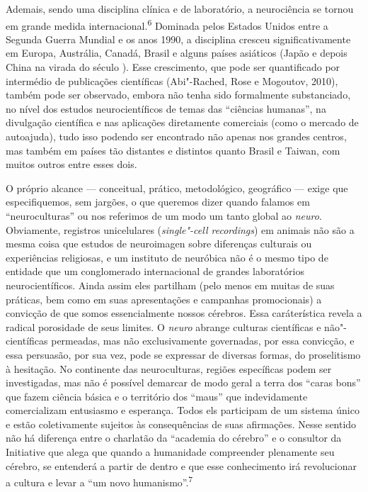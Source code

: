 Ademais, sendo uma disciplina clínica e de laboratório, a neurociência
se tornou em grande medida internacional.\textsuperscript{6} Dominada
pelos Estados Unidos entre a Segunda Guerra Mundial e os anos 1990, a
disciplina cresceu significativamente em Europa, Austrália, Canadá,
Brasil e alguns países asiáticos (Japão e depois China na virada do
século ). Esse crescimento, que pode ser quantificado por intermédio
de publicações científicas (Abi"-Rached, Rose e Mogoutov, 2010), também
pode ser observado, embora não tenha sido formalmente substanciado, no
nível dos estudos neurocientíficos de temas das ``ciências humanas'', na
divulgação científica e nas aplicações diretamente comerciais (como o
mercado de autoajuda), tudo isso podendo ser encontrado não apenas nos
grandes centros, mas também em países tão distantes e distintos quanto
Brasil e Taiwan, com muitos outros entre esses dois.

O próprio alcance --- conceitual, prático, metodológico, geográfico ---
exige que especifiquemos, sem jargões, o que queremos dizer quando
falamos em ``neuroculturas'' ou nos referimos de um modo um tanto global
ao \emph{neuro}. Obviamente, registros unicelulares (\emph{single"-cell
recordings}) em animais não são a mesma coisa que estudos de neuroimagen
sobre diferenças culturais ou experiências religiosas, e um instituto de
neuróbica não é o mesmo tipo de entidade que um conglomerado
internacional de grandes laboratórios neurocientíficos. Ainda assim eles
partilham (pelo menos em muitas de suas práticas, bem como em suas
apresentações e campanhas promocionais) a convicção de que somos
essencialmente nossos cérebros. Essa caráterística revela a radical
porosidade de seus limites. O \emph{neuro} abrange culturas científicas
e não"-científicas permeadas, mas não exclusivamente governadas, por essa
convicção, e essa persuasão, por sua vez, pode se expressar de diversas
formas, do proselitismo à hesitação. No continente das neuroculturas,
regiões específicas podem ser investigadas, mas não é possível demarcar
de modo geral a terra dos ``caras bons'' que fazem ciência básica e o
território dos ``maus'' que indevidamente comercializam entusiasmo e
esperança. Todos els participam de um sistema único e estão
coletivamente sujeitos às consequências de suas afirmações. Nesse
sentido não há diferença entre o charlatão da ``academia do cérebro'' e
o consultor da  Initiative que alega que quando a humanidade
compreender plenamente seu cérebro, se entenderá a partir de dentro e
que esse conhecimento irá revolucionar a cultura e levar a ``um novo
humanismo''.\textsuperscript{7}

